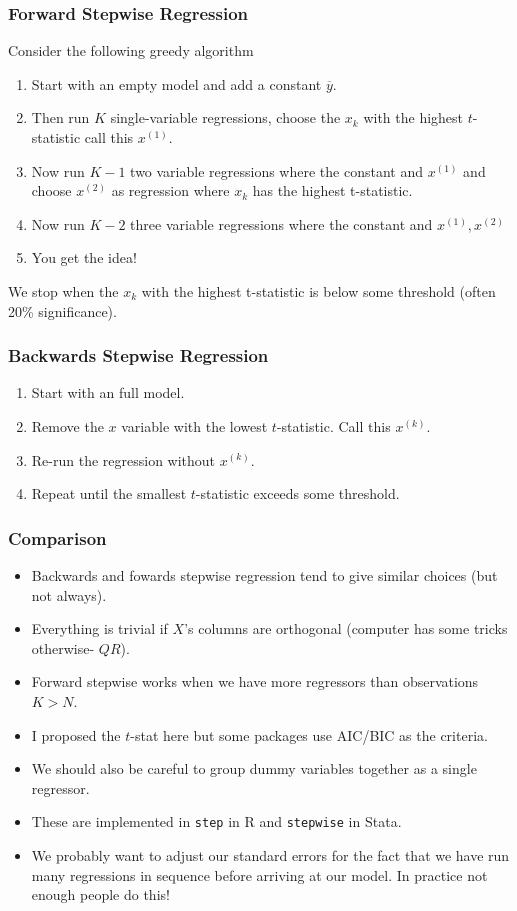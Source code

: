 \begin{frame}
\frametitle{Forward Stepwise Regression}
Consider the following \alert{greedy algorithm}
\begin{enumerate}
\item Start with an empty model and add a constant $\overline{y}$.
\item Then run $K$ single-variable regressions, choose the $x_k$ with the highest $t$-statistic call this $x^{(1)}$.
\item Now run $K-1$ two variable regressions where the constant and $x^{(1)}$ and choose $x^{(2)}$ as regression where $x_k$ has the highest t-statistic.
\item Now run $K-2$ three variable regressions where the constant and $x^{(1)},x^{(2)}$
\item You get the idea!
\end{enumerate}
We stop when the $x_k$ with the highest t-statistic is below some threshold (often 20\% significance).
\end{frame}


\begin{frame}
\frametitle{Backwards Stepwise Regression}
\begin{enumerate}
\item Start with an full model.
\item Remove the $x$ variable with the lowest $t$-statistic. Call this $x^{(k)}$.
\item Re-run the regression without $x^{(k)}$.
\item Repeat until the smallest $t$-statistic exceeds some threshold.
\end{enumerate}
\end{frame}


\begin{frame}
\frametitle{Comparison}
\begin{itemize}
\item Backwards and fowards stepwise regression tend to give similar choices (but not always).
\item Everything is trivial if $X$'s columns are orthogonal (computer has some tricks otherwise- $QR$).
\item Forward stepwise works when we have more regressors than observations $K > N$.
\item I proposed the $t$-stat here but some packages use AIC/BIC as the criteria.
\item We should also be careful to \alert{group dummy variables together} as a single regressor.
\item These are implemented in \texttt{step} in R and \texttt{stepwise} in Stata.
\item We probably want to adjust our standard errors for the fact that we have run many regressions in sequence before arriving at our model. \alert{In practice not enough people do this!}
\end{itemize}
\end{frame}

